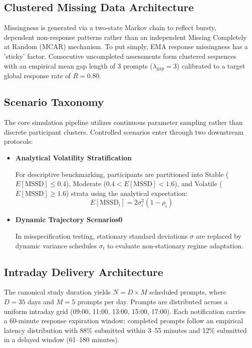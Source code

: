 \documentclass[11pt,letterpaper]{article}
\begin{document}
\subsection{Clustered Missing Data Architecture}

Missingness is generated via a two-state Markov chain to reflect bursty, dependent non-response patterns rather than an independent Missing Completely at Random (MCAR) mechanism. To put simply, EMA response missingness has a 'sticky' factor. Consecutive uncompleted assessments form clustered sequences with an empirical mean gap length of 3 prompts ($\lambda_{\text{gap}} = 3$) calibrated to a target global response rate of $R = 0.80$.

\subsection{Scenario Taxonomy}

The core simulation pipeline utilizes continuous parameter sampling rather than discrete participant clusters. Controlled scenarios enter through two downstream protocols:
\begin{itemize}
    \item \textbf{Analytical Volatility Stratification} 
    
    For descriptive benchmarking, participants are partitioned into Stable ($E[\text{MSSD}] \le 0.4$), Moderate ($0.4 < E[\text{MSSD}] < 1.6$), and Volatile ($E[\text{MSSD}] \ge 1.6$) strata using the analytical expectation:
    \begin{equation}
    E[\text{MSSD}_i] = 2\sigma_i^2(1 - \rho_i)
    \end{equation}
    \item \textbf{Dynamic Trajectory Scenarios0} 
    
    In misspecification testing, stationary standard deviations $\sigma$ are replaced by dynamic variance schedules $\sigma_t$ to evaluate non-stationary regime adaptation.
\end{itemize}

\subsection{Intraday Delivery Architecture}

The canonical study duration yields $N = D \times M$ scheduled prompts, where $D = 35$ days and $M = 5$ prompts per day. Prompts are distributed across a uniform intraday grid (09:00, 11:00, 13:00, 15:00, 17:00). Each notification carries a 60-minute response expiration window; completed prompts follow an empirical latency distribution with 88\% submitted within 3--55 minutes and 12\% submitted in a delayed window (61--180 minutes).
\end{document}
